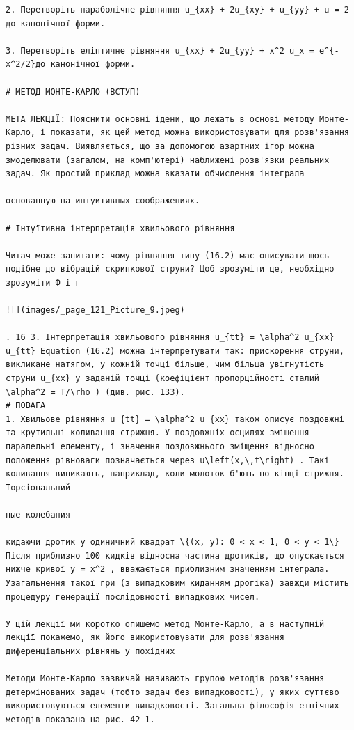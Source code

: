 \documentclass[
  ukrainian,
]{article}
\begin{document}
\begin{verbatim}
2. Перетворіть параболічне рівняння u_{xx} + 2u_{xy} + u_{yy} + u = 2 до канонічної форми.

3. Перетворіть еліптичне рівняння u_{xx} + 2u_{yy} + x^2 u_x = e^{-x^2/2}до канонічної форми.

# МЕТОД МОНТЕ-КАРЛО (ВСТУП)

МЕТА ЛЕКЦІЇ: Пояснити основні ідени, що лежать в основі методу Монте-Карло, і показати, як цей метод можна використовувати для розв'язання різних задач. Виявляється, що за допомогою азартних ігор можна змоделювати (загалом, на комп'ютері) наближені розв'язки реальних задач. Як простий приклад можна вказати обчислення інтеграла

основанную на интуитивных соображениях.

# Інтуїтивна інтерпретація хвильового рівняння

Читач може запитати: чому рівняння типу (16.2) має описувати щось подібне до вібрацій скрипкової струни? Щоб зрозуміти це, необхідно зрозуміти Ф і г

![](images/_page_121_Picture_9.jpeg)

. 16 3. Інтерпретація хвильового рівняння u_{tt} = \alpha^2 u_{xx} u_{tt} Equation (16.2) можна інтерпретувати так: прискорення струни, викликане натягом, у кожній точці більше, чим більша увігнутість струни u_{xx} у заданій точці (коефіцієнт пропорційності сталий \alpha^2 = T/\rho ) (див. рис. 133).
# ПОВАГА
1. Хвильове рівняння u_{tt} = \alpha^2 u_{xx} також описує поздовжні та крутильні коливання стрижня. У поздовжніх осцилях зміщення паралельні елементу, і значення поздовжнього зміщення відносно положення рівноваги позначається через u\left(x,\,t\right) . Такі коливання виникають, наприклад, коли молоток б'ють по кінці стрижня. Торсіональний

ные колебания

кидаючи дротик у одиничний квадрат \{(x, y): 0 < x < 1, 0 < y < 1\} Після приблизно 100 кидків відносна частина дротиків, що опускається нижче кривої y = x^2 , вважається приблизним значенням інтеграла. Узагальнення такої гри (з випадковим киданням дрогіка) завжди містить процедуру генерації послідовності випадкових чисел.

У цій лекції ми коротко опишемо метод Монте-Карло, а в наступній лекції покажемо, як його використовувати для розв'язання диференціальних рівнянь у похідних

Методи Монте-Карло зазвичай називають групою методів розв'язання детермінованих задач (тобто задач без випадковості), у яких суттєво використовуються елементи випадковості. Загальна філософія етнічних методів показана на рис. 42 1.


\end{verbatim}
\end{document}
